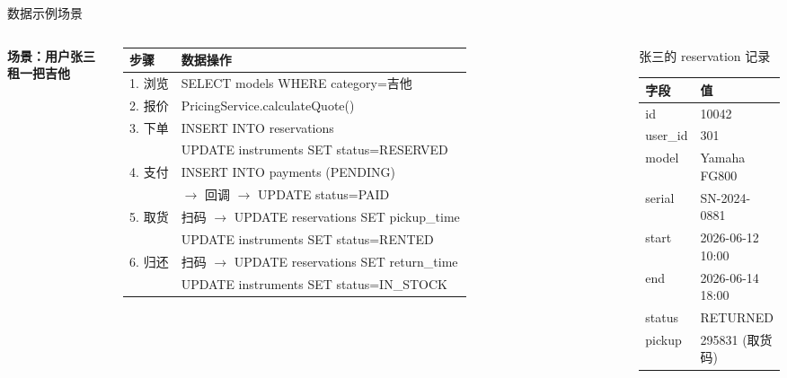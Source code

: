 \documentclass[aspectratio=169,10pt]{beamer}
\newcommand{\HL}[1]{\textcolor{emphasis}{#1}}
\begin{document}
\begin{frame}{数据示例场景}
  \vspace{4pt}
  \begin{columns}[T]
    \textbf{场景：用户张三租一把吉他}

    \vspace{4pt}
    {\footnotesize
    \begin{tabular}{ll}
      \toprule
      \textbf{步骤} & \textbf{数据操作} \\
      \midrule
      1. 浏览 & SELECT models WHERE category=吉他 \\
      2. 报价 & PricingService.calculateQuote() \\
      3. 下单 & INSERT INTO reservations \\
       & UPDATE instruments SET status=RESERVED \\
      4. 支付 & INSERT INTO payments (PENDING) \\
       & $\rightarrow$ 回调 $\rightarrow$ UPDATE status=PAID \\
      5. 取货 & 扫码 $\rightarrow$ UPDATE reservations SET pickup\_time \\
       & UPDATE instruments SET status=RENTED \\
      6. 归还 & 扫码 $\rightarrow$ UPDATE reservations SET return\_time \\
       & UPDATE instruments SET status=IN\_STOCK \\
      \bottomrule
    \end{tabular}
    }

    \begin{block}{张三的 reservation 记录}
      {\footnotesize
      \begin{tabular}{ll}
        \toprule
        \textbf{字段} & \textbf{值} \\
        \midrule
        id      & 10042 \\
        user\_id & 301 \\
        model   & Yamaha FG800 \\
        serial  & SN-2024-0881 \\
        start   & 2026-06-12 10:00 \\
        end     & 2026-06-14 18:00 \\
        status  & \HL{RETURNED} \\
        pickup  & 295831 (取货码) \\
        \bottomrule
      \end{tabular}
      }
    \end{block}


\end{columns}
\end{frame}
\end{document}
